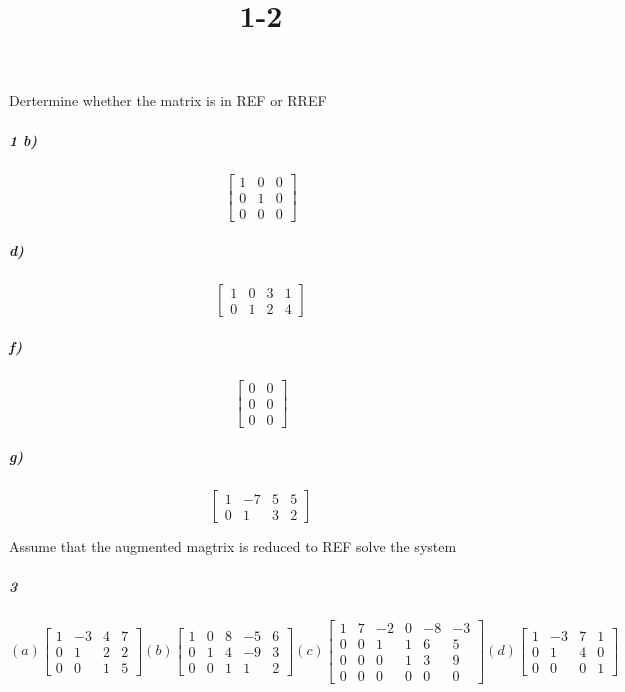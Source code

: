 \documentclass[fleqn]{article}
\title{1-2}
\begin{document}
\maketitle
\pagebreak
 Dertermine whether the matrix is in REF or RREF

\subparagraph{1 b)}

\[
\begin{bmatrix} 1 & 0 & 0 \\ 0 & 1 & 0 \\ 0 & 0 & 0 \end{bmatrix}
\]
\vfill



\subparagraph{d)}

\[
\begin{bmatrix} 1 & 0 & 3 & 1 \\ 0 & 1 & 2 & 4 \end{bmatrix}
\]
\vfill


\pagebreak


\subparagraph{f)}

\[
\begin{bmatrix} 0 & 0 \\ 0 & 0 \\ 0 & 0 \end{bmatrix}
\]
\vfill



\subparagraph{g)}

\[
\begin{bmatrix} 1 & -7 & 5 & 5 \\ 0 & 1 & 3 & 2 \end{bmatrix}
\]
\vfill


\pagebreak
 Assume that the augmented magtrix is reduced to REF solve the system

\subparagraph{3}

\[
 (a) \begin{bmatrix} 1 & -3 & 4 & 7 \\ 0 & 1 & 2 & 2 \\ 0 & 0 & 1 & 5 \end{bmatrix}(b) \begin{bmatrix} 1 & 0 & 8 & -5 & 6 \\ 0 & 1 & 4 & -9 & 3 \\ 0 & 0 & 1 & 1 & 2 \end{bmatrix}(c) \begin{bmatrix} 1 & 7 & -2 & 0 & -8 & -3 \\ 0 & 0 & 1 & 1 & 6 & 5 \\ 0 & 0 & 0 & 1 & 3 & 9 \\ 0 & 0 & 0 & 0 & 0 & 0 \end{bmatrix}(d) \begin{bmatrix} 1 & -3 & 7 & 1 \\ 0 & 1 & 4 & 0 \\ 0 & 0 & 0 & 1 \end{bmatrix}
\]
\vfill
\end{document}
